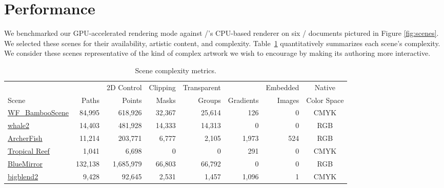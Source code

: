 
\section{Performance}
\label{sec:performance}

We benchmarked our GPU-accelerated rendering mode against
\AGM/'s CPU-based renderer on six \Illustrator/
documents pictured in Figure \ref{fig:scenes}.  We selected these
scenes for their availability, artistic content, and complexity.
Table~\ref{table:scene-metrics} quantitatively summarizes each scene's
complexity.  We consider these scenes representative of the kind of
complex artwork we wish to encourage by making its authoring more
interactive.

\begin{table}
\centering
    \begin{tabular}{| l | r | r | r | r | r | r | c |} 
\hline
      &       & 2D Control &  Clipping & Transparent  &           & Embedded & Native \\
Scene & Paths & Points     &  Masks    & Groups       & Gradients & Images & Color Space \\ \hline \hline

\hyperref[fig:bamboo]{WF\_BambooScene}	& 84,995 & 618,926 & 32,367 & 25,614 & 126 & 0 & CMYK	\\

\hyperref[fig:whale]{whale2}	& 14,403 & 481,928 & 14,333 & 14,313 & 0 & 0 & RGB	 \\

\hyperref[fig:archerfish]{ArcherFish}	& 11,214 & 	203,771 &  6,777 & 2,105 & 1,973 & 524 & RGB \\

\hyperref[fig:reef]{Tropical Reef}	&	1,041 & 6,698 & 0 & 0 & 291 & 0 & CMYK \\

\hyperref[fig:blue-mirror]{BlueMirror}	& 132,138 & 1,685,979	& 66,803 & 66,792 & 0 & 0 & RGB \\




\hyperref[fig:big-blend]{bigblend2} 	&	9,428 & 92,645 & 2,531 & 1,457 & 1,096 & 1 & CMYK \\

    \hline
    \end{tabular}

\caption{Scene complexity metrics.}
\label{table:scene-metrics}

\end{table}

